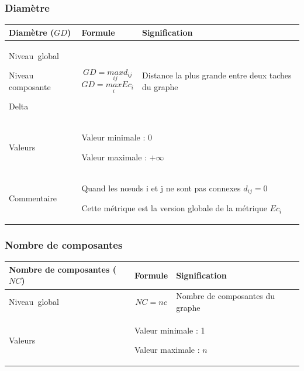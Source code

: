 \documentclass{article}
\begin{document}
\subsubsection{Diamètre}
\label{metric_GD}
\begin{table}[H]
\begin{tabular}{|m{3.24cm}|m{4.4810004cm}m{7.924cm}|}

\hline
Diamètre ($GD$) &
\multicolumn{1}{m{4.4810004cm}|}{Formule} &
Signification\\\hline
Niveau~global  

Niveau composante

Delta &
\multicolumn{1}{m{4.4810004cm}|}{\begin{equation*}
\mathit{GD}=\underset{\mathit{ij}}{\mathit{max}}{d}_{\mathit{ij}}
\end{equation*}
\begin{equation*}
\mathit{GD}=\underset{i}{\mathit{max}}{\mathit{Ec}}_{i}
\end{equation*}
} &
Distance la plus grande entre deux taches du graphe\\\hline
Valeurs &
\multicolumn{2}{m{12.6050005cm}|}{Valeur minimale : 0

Valeur maximale :  $+{\infty}$

}\\\hline
Commentaire &
\multicolumn{2}{m{12.6050005cm}|}{Quand les nœuds i et j ne sont pas connexes  ${d}_{\mathit{ij}}=0$

Cette métrique est la version globale de la métrique  ${\mathit{Ec}}_{i}$

}\\\hline
\end{tabular}
\end{table}


\subsubsection{Nombre de composantes}
\label{metric_NC}
\begin{table}[H]
\raggedright
\begin{tabular}{|m{3.24cm}|m{4.4810004cm}m{7.924cm}|}

\hline
Nombre de composantes ($NC$) &
\multicolumn{1}{m{4.4810004cm}|}{Formule} &
Signification\\\hline
Niveau~global 

 &
\multicolumn{1}{m{4.4810004cm}|}{\begin{equation*}
\mathit{NC}=\mathit{nc}
\end{equation*}
} &
Nombre de composantes du graphe\\\hline
Valeurs &
\multicolumn{2}{m{12.6050005cm}|}{Valeur minimale : 1

Valeur maximale :  $n$

}\\\hline
\end{tabular}
\end{table}
 
\end{document}
